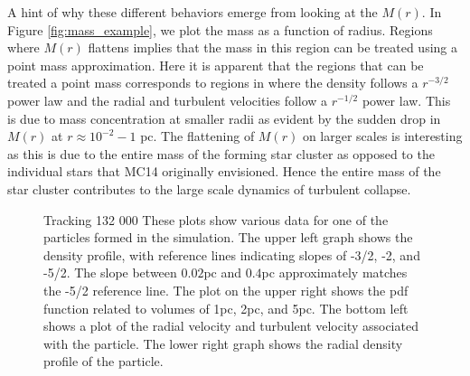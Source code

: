\documentclass{emulateapj}
\begin{document}

A hint of why these different behaviors emerge from looking at the $M(r)$.  In Figure \ref{fig:mass_example}, we plot the mass as a function of radius.  Regions where $M(r)$ flattens implies that the mass in this region can be treated using a point mass approximation.  Here it is apparent that the regions that can be treated a point mass corresponds to regions in where the density follows a $r^{-3/2}$ power law and the radial and turbulent velocities follow a $r^{-1/2}$ power law.  This is due to mass concentration at smaller radii as evident by the sudden drop in $M(r)$ at $r \approx 10^{-2} - 1$ pc.  The flattening of $M(r)$ on larger scales is interesting as this is due to the entire mass of the forming star cluster as opposed to the individual stars that MC14 originally envisioned.  Hence the entire mass of the star cluster contributes to the large scale dynamics of turbulent collapse.    


\begin{figure}
\caption{Tracking 132 000  These plots show various data for one of the particles formed in the simulation.  The upper left graph shows the density profile, with reference lines indicating slopes of -3/2, -2, and -5/2.  The slope between $0.02$pc and $0.4$pc approximately matches the -5/2 reference line.  The plot on the upper right shows the pdf function related to volumes of 1pc, 2pc, and 5pc.  The bottom left shows a plot of the radial velocity and turbulent velocity associated with the particle.  The lower right graph shows the radial density profile of the particle.    \label{fig:132 000 graphs}}
\end{figure}
\end{document}
